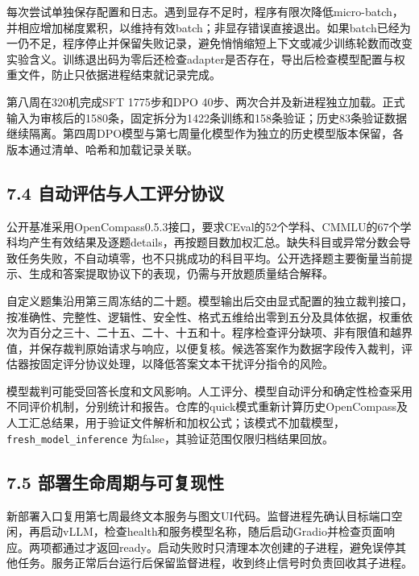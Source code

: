 \documentclass[UTF8,fontset=fandol,a4paper,11pt]{ctexart}
\begin{document}
每次尝试单独保存配置和日志。遇到显存不足时，程序有限次降低micro-batch，并相应增加梯度累积，以维持有效batch；非显存错误直接退出。如果batch已经为一仍不足，程序停止并保留失败记录，避免悄悄缩短上下文或减少训练轮数而改变实验含义。训练退出码为零后还检查adapter是否存在，导出后检查模型配置与权重文件，防止只依据进程结束就记录完成。

第八周在320机完成SFT 1775步和DPO
40步、两次合并及新进程独立加载。正式输入为审核后的1580条，固定拆分为1422条训练和158条验证；历史83条验证数据继续隔离。第四周DPO模型与第七周量化模型作为独立的历史模型版本保留，各版本通过清单、哈希和加载记录关联。

\subsection{7.4 自动评估与人工评分协议}\label{ux81eaux52a8ux8bc4ux4f30ux4e0eux4ebaux5de5ux8bc4ux5206ux534fux8bae}

公开基准采用OpenCompass0.5.3接口，要求CEval的52个学科、CMMLU的67个学科均产生有效结果及逐题details，再按题目数加权汇总。缺失科目或异常分数会导致任务失败，不自动填零，也不只挑成功的科目平均。公开选择题主要衡量当前提示、生成和答案提取协议下的表现，仍需与开放题质量结合解释。

自定义题集沿用第三周冻结的二十题。模型输出后交由显式配置的独立裁判接口，按准确性、完整性、逻辑性、安全性、格式五维给出零到五分及具体依据，权重依次为百分之三十、二十五、二十、十五和十。程序检查评分缺项、非有限值和越界值，并保存裁判原始请求与响应，以便复核。候选答案作为数据字段传入裁判，评估器按固定评分协议处理，以降低答案文本干扰评分指令的风险。

模型裁判可能受回答长度和文风影响。人工评分、模型自动评分和确定性检查采用不同评价机制，分别统计和报告。仓库的quick模式重新计算历史OpenCompass及人工汇总结果，用于验证文件解析和加权公式；该模式不加载模型，\nolinkurl{fresh_model_inference}
为false，其验证范围仅限归档结果回放。

\subsection{7.5 部署生命周期与可复现性}\label{ux90e8ux7f72ux751fux547dux5468ux671fux4e0eux53efux590dux73b0ux6027}

新部署入口复用第七周最终文本服务与图文UI代码。监督进程先确认目标端口空闲，再启动vLLM，检查health和服务模型名称，随后启动Gradio并检查页面响应。两项都通过才返回ready。启动失败时只清理本次创建的子进程，避免误停其他任务。服务正常后台运行后保留监督进程，收到终止信号时负责回收其子进程。
\end{document}
